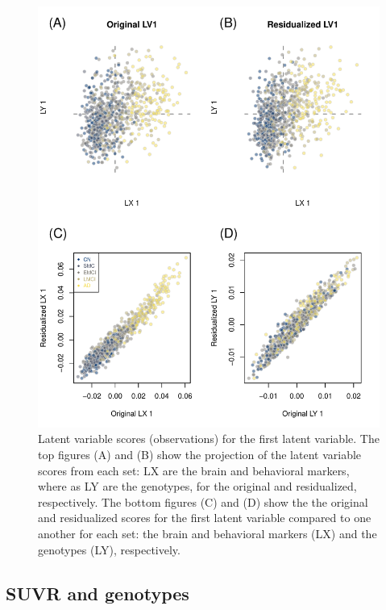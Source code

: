 \documentclass[12pt]{article}
\begin{document}
\begin{figure}[!hbtp]

{\centering \includegraphics[width=.8\textwidth,height=.8\textheight]{PLSCAR_to_a_GPLS_files/figure-latex/unnamed-chunk-11-1} 

}

\caption{\label{fig:lv_compare_ex2} Latent variable scores (observations) for the first latent variable. The top figures (A) and (B) show the projection of the latent variable scores from each set: LX are the brain and behavioral markers, where as LY are the genotypes, for the original and residualized, respectively. The bottom figures (C) and (D) show the the original and residualized scores for the first latent variable compared to one another for each set: the brain and behavioral markers (LX) and the genotypes (LY), respectively.}\label{fig:unnamed-chunk-11}
\end{figure}

\hypertarget{suvr-and-genotypes}{%
\subsection{SUVR and genotypes}\label{suvr-and-genotypes}}

\label{section:big}
\end{document}
